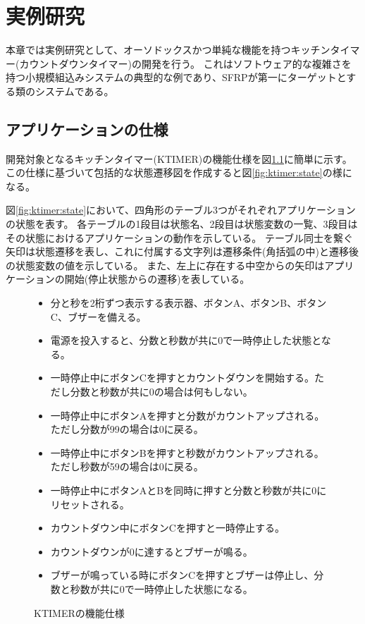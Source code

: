 \chapter{実例研究}
本章では実例研究として、オーソドックスかつ単純な機能を持つキッチンタイマー(カウントダウンタイマー)の開発を行う。
これはソフトウェア的な複雑さを持つ小規模組込みシステムの典型的な例であり、SFRPが第一にターゲットとする類のシステムである。

\section{アプリケーションの仕様}
開発対象となるキッチンタイマー(KTIMER)の機能仕様を図\ref{fig:ktimer:spec}に簡単に示す。
この仕様に基づいて包括的な状態遷移図を作成すると図\ref{fig:ktimer:state}の様になる。

図\ref{fig:ktimer:state}において、四角形のテーブル3つがそれぞれアプリケーションの状態を表す。
各テーブルの1段目は状態名、2段目は状態変数の一覧、3段目はその状態におけるアプリケーションの動作を示している。
テーブル同士を繋ぐ矢印は状態遷移を表し、これに付属する文字列は遷移条件(角括弧の中)と遷移後の状態変数の値を示している。
また、左上に存在する中空からの矢印はアプリケーションの開始(停止状態からの遷移)を表している。


\begin{figure}[h]
\begin{screen}
\begin{itemize}
  \item 分と秒を2桁ずつ表示する表示器、ボタンA、ボタンB、ボタンC、ブザーを備える。
  \item 電源を投入すると、分数と秒数が共に0で一時停止した状態となる。
  \item 一時停止中にボタンCを押すとカウントダウンを開始する。ただし分数と秒数が共に0の場合は何もしない。
  \item 一時停止中にボタンAを押すと分数がカウントアップされる。ただし分数が99の場合は0に戻る。
  \item 一時停止中にボタンBを押すと秒数がカウントアップされる。ただし秒数が59の場合は0に戻る。
  \item 一時停止中にボタンAとBを同時に押すと分数と秒数が共に0にリセットされる。
  \item カウントダウン中にボタンCを押すと一時停止する。
  \item カウントダウンが0に達するとブザーが鳴る。
  \item ブザーが鳴っている時にボタンCを押すとブザーは停止し、分数と秒数が共に0で一時停止した状態になる。
\end{itemize}
\end{screen}
\caption{KTIMERの機能仕様}
\label{fig:ktimer:spec}
\end{figure}

